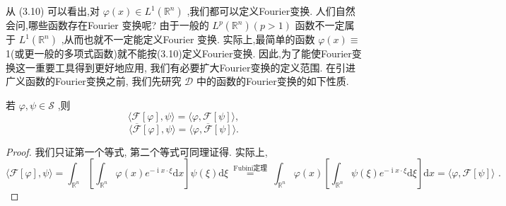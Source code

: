 \documentclass[lang=cn,newtx,10pt,scheme=chinese,thmcnt=chapter]{elegantbook}
\newcommand{\dif}{\mathrm{d}}
\newcommand{\ci}{\operatorname{i}}
\begin{document}
从 (3.10) 可以看出,对 \(\varphi \left( x\right)  \in  {L}^{1}\left( {\mathbb{R}}^{n}\right)\) ,我们都可以定义Fourier变换. 人们自然会问,哪些函数存在Fourier 变换呢? 由于一般的 \({L}^{p}\left( {\mathbb{R}}^{n}\right) \left( {p > 1}\right)\) 函数不一定属于 \({L}^{1}\left( {\mathbb{R}}^{n}\right)\) ,从而也就不一定能定义Fourier 变换. 实际上,最简单的函数 \(\varphi \left( x\right)  \equiv\) 1(或更一般的多项式函数)就不能按(3.10)定义Fourier变换. 因此,为了能使Fourier变换这一重要工具得到更好地应用, 我们有必要扩大Fourier变换的定义范围. 在引进广义函数的Fourier变换之前, 我们先研究 \(\mathcal{D}\) 中的函数的Fourier变换的如下性质.
\begin{proposition}
  若 \(\varphi ,\psi  \in  \mathcal{S}\) ,则
\begin{equation*}
\langle \mathcal{F}\left\lbrack  \varphi \right\rbrack  ,\psi \rangle  = \langle \varphi ,\mathcal{F}\left\lbrack  \psi \right\rbrack  \rangle ,
\end{equation*}
\begin{equation*}
\langle \overline{\mathcal{F}}\left\lbrack  \varphi \right\rbrack  ,\psi \rangle  = \langle \varphi ,\overline{\mathcal{F}}\left\lbrack  \psi \right\rbrack  \rangle .
\end{equation*}
\end{proposition}
\begin{proof}
  我们只证第一个等式, 第二个等式可同理证得. 实际上,
\begin{equation*}
\langle \mathcal{F}\left\lbrack  \varphi \right\rbrack  ,\psi \rangle  = {\int }_{{\mathbb{R}}^{n}}\left\lbrack  {{\int }_{{\mathbb{R}}^{n}}\varphi \left( x\right) {e}^{-{\ci x} \cdot  \xi }{\dif x}}\right\rbrack  \psi \left( \xi \right) {\dif\xi }\overset{\text{ Fubini定理 }}{=}
{\int }_{{\mathbb{R}}^{n}}\varphi \left( x\right) \left\lbrack  {{\int }_{{\mathbb{R}}^{n}}\psi \left( \xi \right) {e}^{-{\ci x} \cdot  \xi }{\dif\xi }}\right\rbrack  {\dif x} = \langle \varphi ,\mathcal{F}\left\lbrack  \psi \right\rbrack  \rangle \text{ . }
\end{equation*}
\end{proof}
\end{document}
